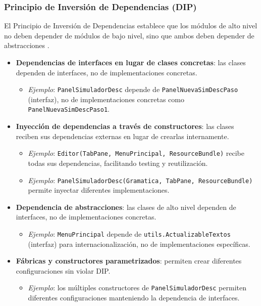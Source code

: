 \subsubsection{Principio de Inversión de Dependencias (DIP)}

El Principio de Inversión de Dependencias establece que los módulos de alto nivel no deben depender de módulos de bajo nivel, sino que ambos deben depender de abstracciones \cite{martin2003agile, martin2018clean}.

\begin{itemize}
    \item \textbf{Dependencias de interfaces en lugar de clases concretas}: las clases dependen de interfaces, no de implementaciones concretas.
    \begin{itemize}
        \item \textit{Ejemplo}: \texttt{PanelSimuladorDesc} depende de \texttt{PanelNuevaSimDescPaso} (interfaz), no de implementaciones concretas como \texttt{PanelNuevaSimDescPaso1}.
    \end{itemize}

    \item \textbf{Inyección de dependencias a través de constructores}: las clases reciben sus dependencias externas en lugar de crearlas internamente.
    \begin{itemize}
        \item \textit{Ejemplo}: \texttt{Editor(TabPane, MenuPrincipal, ResourceBundle)} recibe todas sus dependencias, facilitando testing y reutilización.
        \item \textit{Ejemplo}: \texttt{PanelSimuladorDesc(Gramatica, TabPane, ResourceBundle)} permite inyectar diferentes implementaciones.
    \end{itemize}

    \item \textbf{Dependencia de abstracciones}: las clases de alto nivel dependen de interfaces, no de implementaciones concretas.
    \begin{itemize}
        \item \textit{Ejemplo}: \texttt{MenuPrincipal} depende de \texttt{utils.ActualizableTextos} (interfaz) para internacionalización, no de implementaciones específicas.
    \end{itemize}

    \item \textbf{Fábricas y constructores parametrizados}: permiten crear diferentes configuraciones sin violar DIP.
    \begin{itemize}
        \item \textit{Ejemplo}: los múltiples constructores de \texttt{PanelSimuladorDesc} permiten diferentes configuraciones manteniendo la dependencia de interfaces.
    \end{itemize}
\end{itemize}

